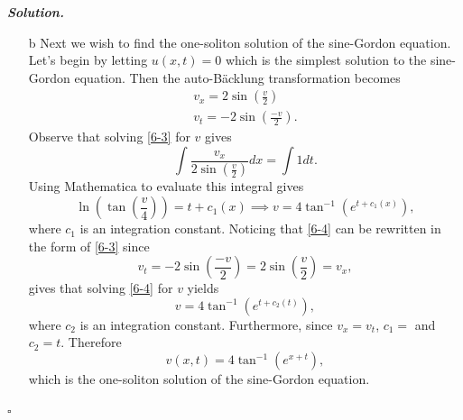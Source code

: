 \documentclass[12pt]{report}
\newenvironment{solution}[1][\it{Solution}]{\textbf{#1. } }{$\square$}
\newcommand{\paren}[1]{{\left(#1\right)}} %
\begin{document}
\begin{solution}
\begin{enumerate}
        \item [b]
        Next we wish to find the one-soliton solution of the sine-Gordon equation. Let's begin by letting $u(x,t) = 0$ which is the simplest solution to the sine-Gordon equation. Then the auto-B\"acklung transformation becomes 
        \begin{align}
            v_x = 2\sin\paren{\frac{v}{2}} \label{6-3}\\
            v_t = -2\sin\paren{\frac{-v}{2}} \label{6-4}.
        \end{align}
        Observe that solving \ref{6-3} for $v$ gives
        \[ 
            \int \frac{v_x}{2\sin\paren{\frac{v}{2}}}dx = \int 1 dt.
        \]
        Using Mathematica to evaluate this integral gives
        \[
            \ln\paren{\tan\paren{\frac{v}{4}}} = t + c_1(x)
            \implies v = 4 \tan^{-1}(e^{t+c_1(x)}),
        \]
        where $c_1$ is an integration constant.
        Noticing that \ref{6-4} can be rewritten in the form of \ref{6-3} since 
        \[ 
            v_t = -2\sin\paren{\frac{-v}{2}} = 2\sin\paren{\frac{v}{2}} = v_x,
        \]
        gives that solving \ref{6-4} for $v$ yields
        \[ 
            v = 4 \tan^{-1}(e^{t+c_2(t)}),
        \]
        where $c_2$ is an integration constant. Furthermore, since $v_x = v_t$, $c_1 = $ and $c_2 = t$. Therefore
        \[ 
            v(x,t) = 4 \tan^{-1}\paren{e^{x+t}},
        \] 
        which is the one-soliton solution of the sine-Gordon equation. 

    \end{enumerate}
\end{solution}

\newpage
\end{document}
